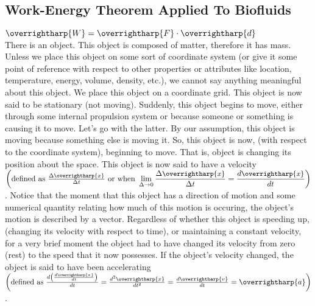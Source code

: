 \documentclass[12pt, a4paper]{article}
\theoremstyle{definition}
\theoremstyle{remark}
\theoremstyle{definition}
\newcommand*{\vtr}[1]{\text{\overrightharp{\ensuremath{#1}}}}
\newcommand{\?}{\stackrel{?}{=}}
\begin{document}
\subsection{Work-Energy Theorem Applied To Biofluids}
$\vtr{W} = \vtr{F} \cdot \vtr{d}$\\
There is an object. This object is composed of matter, therefore it has mass. Unless we place this object on some sort of coordinate system (or give it some point of reference with respect to other properties or attributes like location, temperature, energy, volume, density, etc.), we cannot say anything meaningful about this object. We place this object on a coordinate grid. This object is now said to be stationary (not moving). Suddenly, this object begins to move, either through some internal propulsion system or because someone or something is causing it to move. Let's go with the latter. By our assumption, this object is moving because something else is moving it. So, this object is now, (with respect to the coordinate system), beginning to move. That is, object is changing its position about the space. This object is now said to have a velocity $\left(\text{defined as } \frac{\Delta \vtr{x}}{\Delta t }   \text { or when } \displaystyle \small\lim_{\Delta \to 0} \frac{\Delta \vtr{x}}{\Delta t} = \frac{d\vtr{x}}{dt} \right)$. Notice that the moment that this object has a direction of motion and some numerical quantity relating how much of this motion is occuring, the object's motion is described by a vector. Regardless of whether this object is speeding up, (changing its velocity with respect to time), or maintaining a constant velocity, for a very brief moment the object had to have changed its velocity from zero (rest) to the speed that it now possesses. If the object’s velocity changed, the object is said to have been accelerating $\left(\text{defined as } \frac{d\left(\frac{d\vtr{x}}{dt}\right)}{dt} = \frac{d^{2}\vtr{x}}{dt^{2}} = \frac{d\vtr{v}}{dt} = \vtr{a}\right)$. \\
\end{document}
